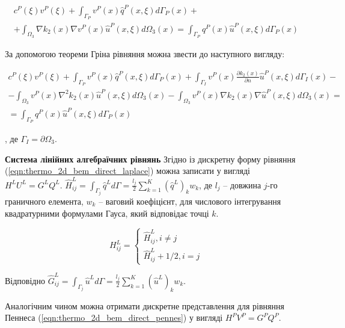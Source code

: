 \begin{equation*}
    \begin{split}
    c^P(\xi)v^P(\xi) + \int_{\Gamma_P}v^P(x)\hat{q}^P(x,\xi)d\Gamma_P(x) + \\ 
        + \int_{\Omega_3} \nabla{k_2(x)}\nabla{v^P(x)} \hat{u}^P(x,\xi) d \Omega_3(x) = 
        \int_{\Gamma_P}q^P(x)\hat{u}^P(x,\xi)d\Gamma_P(x)
    \end{split}
\end{equation*}

За допомогою теореми Гріна рівняння можна звести до наступного вигляду:

\begin{equation}
    \label{eqn:thermo_2d_bem_direct_pennes}
    \begin{split}
    c^P(\xi)v^P(\xi) + \int_{\Gamma_P}v^P(x)\hat{q}^P(x,\xi)d\Gamma_P(x) 
        +  \int_{\Gamma_I} v^P(x) \frac{\partial{k_2(x)}}{\partial{n}} \hat{u}^P(x,\xi) d \Gamma_I(x) - \\
        - \int_{\Omega_3}v^P(x) \nabla^2 k_2(x) \hat{u}^P(x,\xi) d\Omega_3(x) 
        - \int_{\Omega_3}v^P(x) \nabla k_2(x) \nabla \hat{u}^P(x,\xi) d\Omega_3(x) = \\
        = \int_{\Gamma_P}q^P(x)\hat{u}^P(x,\xi)d\Gamma_P(x)
    \end{split}
\end{equation}

\noindent, де $\Gamma_I = \partial \Omega_3$.

\textbf{Система лінійних алгебраїчних рівнянь} Згідно із \cite{brebbia-bem} дискретну форму рівняння 
(\ref{eqn:thermo_2d_bem_direct_laplace}) можна записати у вигляді 
$H^LU^L=G^LQ^L$. $\hat{H}_{ij}^L=\int_{\Gamma_j} \hat{q}^L d \Gamma = \frac{l_j}{2} \sum_{k=1}^{K} (\hat{q}^L)_k w_k $,
де $l_j$ -- довжина $j$-го граничного елемента, $w_k$ -- ваговий коефіцієнт, для числового інтегрування квадратурними 
формулами Гауса, який відповідає точці $k$. 

$$H_{ij}^L=\begin{cases}
\hat{H}_{ij}^L, i \neq j \\
\hat{H}_{ij}^L + 1/2, i = j
\end{cases}
$$

\noindent Відповідно $\hat{G}_{ij}^L=\int_{\Gamma_j} \hat{u}^L d \Gamma = \frac{l_j}{2} 
\sum_{k=1}^{K} (\hat{u}^L)_k w_k$.

Аналогічним чином можна отримати дискретне представлення для рівняння Пеннеса (\ref{eqn:thermo_2d_bem_direct_pennes}) у 
вигляді $H^P V^P = G^P Q^P$.

